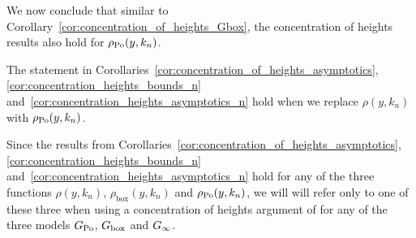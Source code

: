 We now conclude that similar to Corollary~\ref{cor:concentration_of_heights_Gbox}, the concentration of heights results also hold for $\rho_{{\mathrm{Po}}}(y,k_n)$.

\begin{corollary}\label{cor:concentration_of_heights_GPo}
The statement in Corollaries~\ref{cor:concentration_of_heights_asymptotics}, \ref{cor:concentration_heights_bounds_n}
and~\ref{cor:concentration_heights_asymptotics_n} hold when we replace $\rho(y,k_n)$ with $\rho_{{\mathrm{Po}}}(y,k_n)$.
\end{corollary}

\begin{remark}
Since the results from Corollaries~\ref{cor:concentration_of_heights_asymptotics}, \ref{cor:concentration_heights_bounds_n} and~\ref{cor:concentration_heights_asymptotics_n} hold for any of the three functions $\rho(y,k_n)$, $\rho_{\text{box}}(y,k_n)$ and $\rho_{{\mathrm{Po}}}(y,k_n)$, we will will refer only to one of these three when using a concentration of heights argument of for any of the three models $G_{{\mathrm{Po}}}$, $G_{\mathrm{box}}$ and $G_{\infty}$. 
\end{remark}

